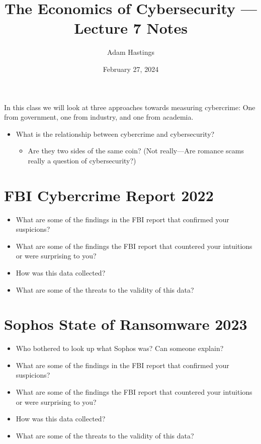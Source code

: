 \documentclass[11pt]{article}
\title{The Economics of Cybersecurity --- Lecture 7 Notes}
\date{February 27, 2024}
\author{Adam Hastings}
\begin{document}
\maketitle


In this class we will look at three approaches towards measuring cybercrime: One from government, one from industry, and one from academia.

\begin{itemize}
    \item What is the relationship between cybercrime and cybersecurity?
    \begin{itemize}
        \item Are they two sides of the same coin? (Not really---Are romance scams really a question of cybersecurity?)
    \end{itemize}
\end{itemize}

\section*{FBI Cybercrime Report 2022}

\begin{itemize}
    \item What are some of the findings in the FBI report that confirmed your suspicions?
    \item What are some of the findings the FBI report that countered your intuitions or were surprising to you? 
    \item How was this data collected?
    \item What are some of the threats to the validity of this data?
\end{itemize}

\section*{Sophos State of Ransomware 2023}

\begin{itemize}
    \item Who bothered to look up what Sophos was? Can someone explain?
    \item What are some of the findings in the FBI report that confirmed your suspicions?
    \item What are some of the findings the FBI report that countered your intuitions or were surprising to you? 
    \item How was this data collected?
    \item What are some of the threats to the validity of this data?
\end{itemize}
\end{document}
